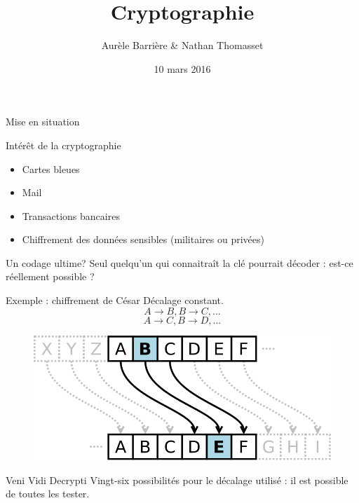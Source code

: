 \documentclass{beamer}
\author{Aurèle Barrière \& Nathan Thomasset}
\title{Cryptographie}
\date{10 mars 2016}
\begin{document}
\begin{frame}
\maketitle
\end{frame}

\begin{frame}{Mise en situation}
  \end{frame}

\begin{frame}{Intérêt de la cryptographie}
  \begin{itemize}
  \item Cartes bleues
    
  \item Mail
    
  \item Transactions bancaires
  
  \item Chiffrement des données sensibles (militaires ou privées)
\end{itemize}
\end{frame}

\begin{frame}{Un codage ultime?}
  Seul quelqu'un qui connaitraît la clé pourrait décoder : est-ce réellement possible ?
  \end{frame}

\begin{frame}{Exemple : chiffrement de César}
  Décalage constant. 
$$A\rightarrow B, B\rightarrow C, \text{...}$$ 
$$A\rightarrow C, B\rightarrow D, \text{...}$$

  \begin{figure}
    \centering
  \includegraphics[scale = 0.25]{cesar.png}
\end{figure}
\end{frame}

\begin{frame}{Veni Vidi Decrypti}
  Vingt-six possibilités pour le décalage utilisé : il est possible de toutes les tester.
  \end{frame}
\end{document}
